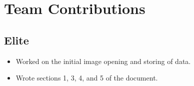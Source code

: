 \documentclass[11pt]{article}
\begin{document}








\section{Team Contributions}


\subsection{Elite}

\begin{itemize}
  \item Worked on the initial image opening and storing of data.
  \item Wrote sections 1, 3, 4, and 5 of the document.
\end{itemize}
\end{document}

